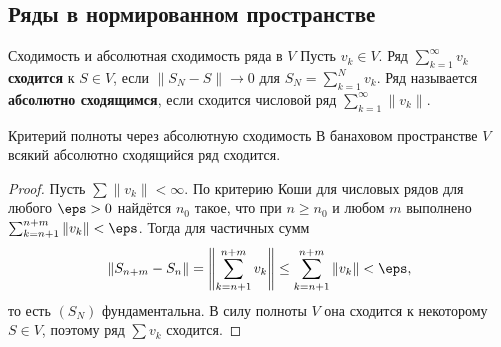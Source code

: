 \subsection*{Ряды в нормированном пространстве}

\begin{Definition}{Сходимость и абсолютная сходимость ряда в $V$}{}
	Пусть $v_k\in V$. Ряд $\sum_{k=1}^{\infty} v_k$ \textbf{сходится} к $S\in V$,
	если $\|S_N-S\|\to0$ для $S_N=\sum_{k=1}^{N} v_k$. Ряд называется
	\textbf{абсолютно сходящимся}, если сходится числовой ряд
	$\sum_{k=1}^{\infty}\|v_k\|$.
\end{Definition}

\begin{Theorem}{Критерий полноты через абсолютную сходимость}{}
	В банаховом пространстве $V$ всякий абсолютно сходящийся ряд сходится.
\end{Theorem}

\begin{proof}
	Пусть $\sum\|v_k\|<\infty$. По критерию Коши для числовых рядов для любого
	$\eps>0$ найдётся $n_0$ такое, что при $n\ge n_0$ и любом $m$ выполнено
	$\sum_{k=n+1}^{n+m}\|v_k\|<\eps$. Тогда для частичных сумм
	\[
	\|S_{n+m}-S_n\|=\left\|\sum_{k=n+1}^{n+m} v_k\right\|
	\le\sum_{k=n+1}^{n+m}\|v_k\|<\eps,
	\]
	то есть $(S_N)$ фундаментальна. В силу полноты $V$ она сходится к
	некоторому $S\in V$, поэтому ряд $\sum v_k$ сходится.
\end{proof}
